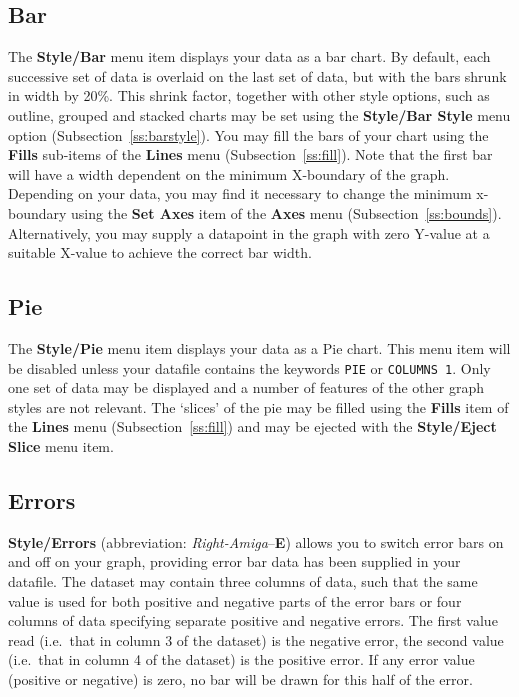 \documentclass{report}
\newcommand{\RA}[1]{\mbox{{\em Right-Amiga}--{\bf #1}}}
\begin{document}
\subsection{Bar}
The {\bf Style/Bar}  menu item displays your data as 
a bar chart. By default, each 
successive set of data is overlaid on the last set of data, but with the bars 
shrunk in width by 20\%. This shrink factor, together with other style options, 
such as outline, grouped and stacked charts may be set using the {\bf Style/Bar 
Style} menu option (Subsection~\ref{ss:barstyle}). You may fill the bars of 
your chart 
using the {\bf Fills} sub-items of the {\bf Lines} menu (Subsection~\ref{ss:fill}).
Note that the first bar will have a width dependent on the minimum X-boundary of 
the graph. Depending on your data, you may find it necessary to change the minimum 
x-boundary using the 
{\bf Set Axes} item of the {\bf Axes} menu (Subsection~\ref{ss:bounds}).
Alternatively, you may supply a datapoint in the graph with zero Y-value at a 
suitable X-value to achieve the correct bar width.

\subsection{Pie}
The {\bf Style/Pie}  menu item displays your data as 
a Pie chart. This menu item will be disabled unless your datafile contains the 
keywords {\tt PIE} or {\tt COLUMNS 1}. Only one set of data may 
be displayed and a number of features of the other graph styles are not relevant. 
The `slices' of the pie may be filled using the {\bf Fills} item of the
{\bf Lines} menu (Subsection~\ref{ss:fill}) and may be ejected with the {\bf 
Style/Eject Slice} menu item. 


\subsection{Errors}
{\bf Style/Errors} (abbreviation: \RA{E}) allows  you to switch error 
bars on and off on your graph, providing 
error bar data has been supplied in your datafile.
The dataset may contain three columns of data, such that the same value is
used for both positive and negative parts of the
error bars or four columns of data specifying separate positive and
negative errors. The first value read (i.e.\ that in column 3 of the dataset)
is the negative error, the second value (i.e.\ that in column 4 of the dataset)
is the positive error. If any error value (positive or negative) is zero, no bar
will be drawn for this half of the error.
\end{document}
